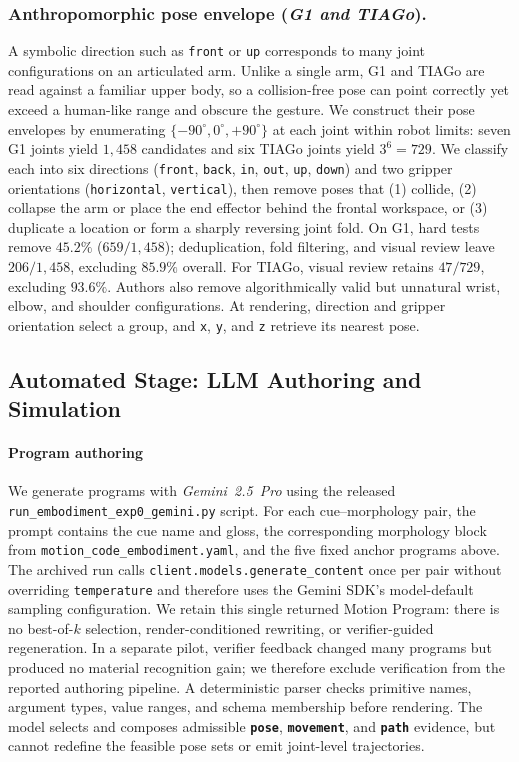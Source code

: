 \documentclass[letterpaper,10pt,conference]{ieeeconf}
\newcommand{\posecolor}[1]{\texttt{\textbf{\textcolor{PoseColor}{#1}}}}
\newcommand{\movecolor}[1]{\texttt{\textbf{\textcolor{MoveColor}{#1}}}}
\newcommand{\pathcolor}[1]{\texttt{\textbf{\textcolor{PathColor}{#1}}}}
\newcommand{\method}{Motion Program}
\begin{document}
\subsubsection{Anthropomorphic pose envelope (\textit{G1 and TIAGo}).}
A symbolic direction such as \texttt{front} or \texttt{up} corresponds to many joint configurations on an articulated arm.
Unlike a single arm, G1 and TIAGo are read against a familiar upper body, so a collision-free pose can point correctly yet exceed a human-like range and obscure the gesture.
We construct their pose envelopes by enumerating $\{-90^{\circ},0^{\circ},+90^{\circ}\}$ at each joint within robot limits: seven G1 joints yield $1{,}458$ candidates and six TIAGo joints yield $3^6=729$.
We classify each into six directions (\texttt{front}, \texttt{back}, \texttt{in}, \texttt{out}, \texttt{up}, \texttt{down}) and two gripper orientations (\texttt{horizontal}, \texttt{vertical}), then remove poses that (1) collide, (2) collapse the arm or place the end effector behind the frontal workspace, or (3) duplicate a location or form a sharply reversing joint fold.
On G1, hard tests remove $45.2\%$ ($659/1{,}458$); deduplication, fold filtering, and visual review leave $206/1{,}458$, excluding $85.9\%$ overall.
For TIAGo, visual review retains $47/729$, excluding $93.6\%$.
Authors also remove algorithmically valid but unnatural wrist, elbow, and shoulder configurations.
At rendering, direction and gripper orientation select a group, and \texttt{x}, \texttt{y}, and \texttt{z} retrieve its nearest pose.

\subsection{Automated Stage: LLM Authoring and Simulation}
\paragraph{Program authoring}
We generate programs with \textit{Gemini~2.5~Pro} using the released \texttt{run\_embodiment\_exp0\_gemini.py} script.
For each cue--morphology pair, the prompt contains the cue name and gloss, the corresponding morphology block from \texttt{motion\_code\_embodiment.yaml}, and the five fixed anchor programs above.
The archived run calls \texttt{client.models.generate\_content} once per pair without overriding \texttt{temperature} and therefore uses the Gemini SDK's model-default sampling configuration.
We retain this single returned \method{}: there is no best-of-$k$ selection, render-conditioned rewriting, or verifier-guided regeneration.
In a separate pilot, verifier feedback changed many programs but produced no material recognition gain; we therefore exclude verification from the reported authoring pipeline.
A deterministic parser checks primitive names, argument types, value ranges, and schema membership before rendering.
The model selects and composes admissible \posecolor{pose}, \movecolor{movement}, and \pathcolor{path} evidence, but cannot redefine the feasible pose sets or emit joint-level trajectories.
\end{document}
